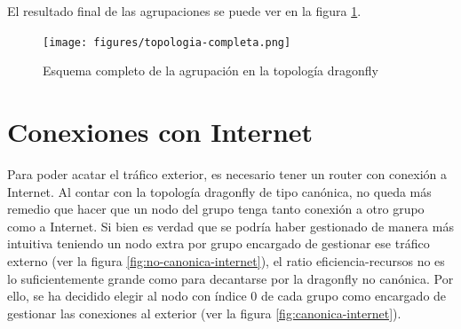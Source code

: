 \documentclass[%
    school=etsisi,%
    degree=61TI,%
]{upm-report}
\begin{document}
El resultado final de las agrupaciones se puede ver en la figura \ref{fig:topologia-completa}.

\begin{figure}
    \centering
    \texttt{[image: figures/topologia-completa.png]}
    \caption{\label{fig:topologia-completa} Esquema completo de la agrupación en la topología dragonfly}
\end{figure}

\section{Conexiones con Internet}
\label{sec:conexiones-internet}

Para poder acatar el tráfico exterior, es necesario tener un router con conexión a Internet. Al contar con la topología dragonfly de tipo canónica, no queda más remedio que hacer que un nodo del grupo tenga tanto conexión a otro grupo como a Internet. Si bien es verdad que se podría haber gestionado de manera más intuitiva teniendo un nodo extra por grupo encargado de gestionar ese tráfico externo (ver la figura \ref{fig:no-canonica-internet}), el ratio eficiencia-recursos no es lo suficientemente grande como para decantarse por la dragonfly no canónica. Por ello, se ha decidido elegir al nodo con índice 0 de cada grupo como encargado de gestionar las conexiones al exterior (ver la figura \ref{fig:canonica-internet}).
\end{document}
